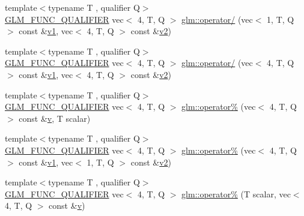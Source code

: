 \begin{DoxyCompactItemize}
\item 
{\footnotesize template$<$typename T , qualifier Q$>$ }\\\mbox{\hyperlink{setup_8hpp_a33fdea6f91c5f834105f7415e2a64407}{G\+L\+M\+\_\+\+F\+U\+N\+C\+\_\+\+Q\+U\+A\+L\+I\+F\+I\+ER}} vec$<$ 4, T, Q $>$ \mbox{\hyperlink{namespaceglm_ae51eb3631694f573b97e5d06710bfe8f}{glm\+::operator/}} (vec$<$ 1, T, Q $>$ const \&\mbox{\hyperlink{_s_d_l__opengl__glext_8h_a435c176a02c061b43e19bdf7c86cceae}{v1}}, vec$<$ 4, T, Q $>$ const \&\mbox{\hyperlink{_s_d_l__opengl__glext_8h_a0928f6d0f0f794ba000a21dfae422136}{v2}})
\item 
{\footnotesize template$<$typename T , qualifier Q$>$ }\\\mbox{\hyperlink{setup_8hpp_a33fdea6f91c5f834105f7415e2a64407}{G\+L\+M\+\_\+\+F\+U\+N\+C\+\_\+\+Q\+U\+A\+L\+I\+F\+I\+ER}} vec$<$ 4, T, Q $>$ \mbox{\hyperlink{namespaceglm_a86aed5e0fe0d401757f325b85a148d53}{glm\+::operator/}} (vec$<$ 4, T, Q $>$ const \&\mbox{\hyperlink{_s_d_l__opengl__glext_8h_a435c176a02c061b43e19bdf7c86cceae}{v1}}, vec$<$ 4, T, Q $>$ const \&\mbox{\hyperlink{_s_d_l__opengl__glext_8h_a0928f6d0f0f794ba000a21dfae422136}{v2}})
\item 
{\footnotesize template$<$typename T , qualifier Q$>$ }\\\mbox{\hyperlink{setup_8hpp_a33fdea6f91c5f834105f7415e2a64407}{G\+L\+M\+\_\+\+F\+U\+N\+C\+\_\+\+Q\+U\+A\+L\+I\+F\+I\+ER}} vec$<$ 4, T, Q $>$ \mbox{\hyperlink{namespaceglm_a51232c88207c54b5c4b04ed1a711ec53}{glm\+::operator\%}} (vec$<$ 4, T, Q $>$ const \&\mbox{\hyperlink{_s_d_l__opengl_8h_a10a82eabcb59d2fcd74acee063775f90}{v}}, T scalar)
\item 
{\footnotesize template$<$typename T , qualifier Q$>$ }\\\mbox{\hyperlink{setup_8hpp_a33fdea6f91c5f834105f7415e2a64407}{G\+L\+M\+\_\+\+F\+U\+N\+C\+\_\+\+Q\+U\+A\+L\+I\+F\+I\+ER}} vec$<$ 4, T, Q $>$ \mbox{\hyperlink{namespaceglm_aad267e1b19a09f011b37c42ca2705f31}{glm\+::operator\%}} (vec$<$ 4, T, Q $>$ const \&\mbox{\hyperlink{_s_d_l__opengl__glext_8h_a435c176a02c061b43e19bdf7c86cceae}{v1}}, vec$<$ 1, T, Q $>$ const \&\mbox{\hyperlink{_s_d_l__opengl__glext_8h_a0928f6d0f0f794ba000a21dfae422136}{v2}})
\item 
{\footnotesize template$<$typename T , qualifier Q$>$ }\\\mbox{\hyperlink{setup_8hpp_a33fdea6f91c5f834105f7415e2a64407}{G\+L\+M\+\_\+\+F\+U\+N\+C\+\_\+\+Q\+U\+A\+L\+I\+F\+I\+ER}} vec$<$ 4, T, Q $>$ \mbox{\hyperlink{namespaceglm_ad8c305394e96c6087ef061aa0a0eeda2}{glm\+::operator\%}} (T scalar, vec$<$ 4, T, Q $>$ const \&\mbox{\hyperlink{_s_d_l__opengl_8h_a10a82eabcb59d2fcd74acee063775f90}{v}})

\end{DoxyCompactItemize}
